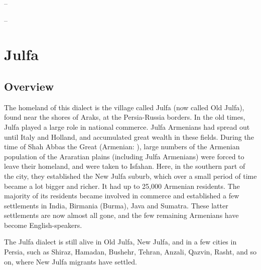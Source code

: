 – 

– 




\chapter{Julfa} \label{chapter:Julfa}

\begin{adjarianpage}\label{page:87}\end{adjarianpage}%

\section{Overview}

The homeland of this dialect is the village called Julfa (now called Old Julfa), found near the shores of Araks, at the Persia-Russia borders. In the old times, Julfa played a large role in national commerce. Julfa Armenians had spread out until Italy and Holland, and accumulated great wealth in these fields. During the time of Shah Abbas the Great (Armenian: ), large numbers of the Armenian population of the Araratian plains (including Julfa Armenians) were forced to leave their homeland, and were taken to Isfahan. Here, in the southern part of the city, they established the New Julfa suburb, which over a small period of time became a lot bigger and richer. It had up to 25,000 Armenian residents. The majority of its residents became involved in commerce and established a few settlements in India, Birmania (Burma), Java and Sumatra. These latter settlements are now almost all gone, and the few remaining Armenians have become English-speakers. 

The Julfa dialect is still alive in Old Julfa, New Julfa, and in a few cities in Persia, such as Shiraz, Hamadan, Bushehr, Tehran, Anzali, Qazvin, Rasht, and so on, where New Julfa migrants have settled. 

